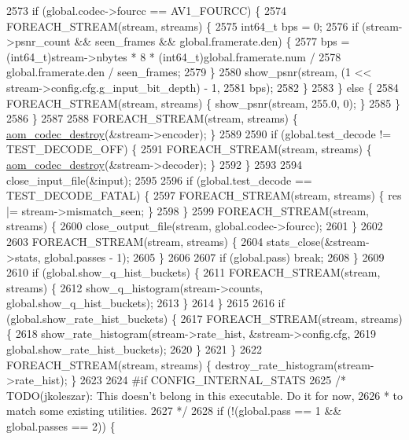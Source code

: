 \begin{DoxyCodeInclude}
{{{{{{{{{{{{{{{{{{{{{{{{{{{{{{{{{{{{{{{{{{{{{{{{{{{{{{{{{{{{{{2573       \textcolor{keywordflow}{if} (global.codec->fourcc == AV1\_FOURCC) \{
2574         FOREACH\_STREAM(stream, streams) \{
2575           int64\_t bps = 0;
2576           \textcolor{keywordflow}{if} (stream->psnr\_count && seen\_frames && global.framerate.den) \{
2577             bps = (int64\_t)stream->nbytes * 8 * (int64\_t)global.framerate.num /
2578                   global.framerate.den / seen\_frames;
2579           \}
2580           show\_psnr(stream, (1 << stream->config.cfg.g\_input\_bit\_depth) - 1,
2581                     bps);
2582         \}
2583       \} \textcolor{keywordflow}{else} \{
2584         FOREACH\_STREAM(stream, streams) \{ show\_psnr(stream, 255.0, 0); \}
2585       \}
2586     \}
2587 
2588     FOREACH\_STREAM(stream, streams) \{ \hyperlink{group__codec_ga9b60e186f61ba2d6ab2b8069b76a15c5}{aom\_codec\_destroy}(&stream->encoder); \}
2589 
2590     \textcolor{keywordflow}{if} (global.test\_decode != TEST\_DECODE\_OFF) \{
2591       FOREACH\_STREAM(stream, streams) \{ \hyperlink{group__codec_ga9b60e186f61ba2d6ab2b8069b76a15c5}{aom\_codec\_destroy}(&stream->decoder); \}
2592     \}
2593 
2594     close\_input\_file(&input);
2595 
2596     \textcolor{keywordflow}{if} (global.test\_decode == TEST\_DECODE\_FATAL) \{
2597       FOREACH\_STREAM(stream, streams) \{ res |= stream->mismatch\_seen; \}
2598     \}
2599     FOREACH\_STREAM(stream, streams) \{
2600       close\_output\_file(stream, global.codec->fourcc);
2601     \}
2602 
2603     FOREACH\_STREAM(stream, streams) \{
2604       stats\_close(&stream->stats, global.passes - 1);
2605     \}
2606 
2607     \textcolor{keywordflow}{if} (global.pass) \textcolor{keywordflow}{break};
2608   \}
2609 
2610   \textcolor{keywordflow}{if} (global.show\_q\_hist\_buckets) \{
2611     FOREACH\_STREAM(stream, streams) \{
2612       show\_q\_histogram(stream->counts, global.show\_q\_hist\_buckets);
2613     \}
2614   \}
2615 
2616   \textcolor{keywordflow}{if} (global.show\_rate\_hist\_buckets) \{
2617     FOREACH\_STREAM(stream, streams) \{
2618       show\_rate\_histogram(stream->rate\_hist, &stream->config.cfg,
2619                           global.show\_rate\_hist\_buckets);
2620     \}
2621   \}
2622   FOREACH\_STREAM(stream, streams) \{ destroy\_rate\_histogram(stream->rate\_hist); \}
2623 
2624 \textcolor{preprocessor}{#if CONFIG\_INTERNAL\_STATS}
2625   \textcolor{comment}{/* TODO(jkoleszar): This doesn't belong in this executable. Do it for now,}
2626 \textcolor{comment}{   * to match some existing utilities.}
2627 \textcolor{comment}{   */}
2628   \textcolor{keywordflow}{if} (!(global.pass == 1 && global.passes == 2)) \{
}}}}}}}}}}}}}}}}}}}}}}}}}}}}}}}}}}}}}}}}}}}}}}}}}}}}}}}}}}}}}}
\end{DoxyCodeInclude}
